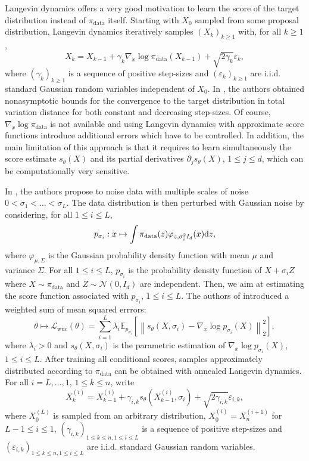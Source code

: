\documentclass[english,graybox,envcountchap,envcountsame,sectrefs,shortlabels]{svmono}
\theoremstyle{style}
\newcommand{\eqsp}{}
\begin{document}
Langevin dynamics offers a very good motivation to learn the score of the target distribution instead of $\pi_{\mathrm{data}}$ itself. Starting with $X_0$ sampled from some proposal distribution, Langevin dynamics iteratively samples $(X_k)_{k\geq 1}$ with, for all $k\geq 1$,
$$
X_{k} = X_{k-1} +  \gamma_k \nabla_x\log\pi_{\mathrm{data}}(X_{k-1}) + \sqrt{2\gamma_k}\varepsilon_k\eqsp,
$$
where $(\gamma_k)_{k\geq 1}$ is a sequence of positive step-sizes and $(\varepsilon_k)_{k\geq 1}$ are i.i.d. standard Gaussian random variables independent of $X_0$.  In \cite{durmus2017nonasymptotic}, the authors obtained nonasymptotic bounds for the convergence to the target distribution in total variation distance for both constant and decreasing step-sizes. Of course, $\nabla_x\log\pi_{\mathrm{data}}$ is not available and using Langevin dynamics with approximate score functions introduce additional errors which have to be controlled. In addition, the main limitation of this approach is that it requires to learn simultaneously the score estimate $s_\theta(X)$ and its partial derivatives $\partial_j s_\theta(X)$, $1\leq j \leq d$, which can be computationally very sensitive.

In \cite{song2019generative}, the authors propose to noise data with  multiple scales of noise $0<\sigma_1 < \ldots <\sigma_L$. The data distribution is then perturbed with Gaussian noise by considering, for all $1\leq i \leq L$,
$$
p_{\sigma_i}:x \mapsto \int \pi_{\mathrm{data}}(z)\varphi_{z,\sigma^2_i I_d}(x)\rmd z\eqsp,
$$   
where $\varphi_{\mu,\Sigma}$ is the Gaussian probability density function with mean $\mu$ and variance $\Sigma$. For all $1\leq i \leq L$, $p_{\sigma_i}$ is the probability density function of $X + \sigma_i Z$ where $X\sim \pi_{\mathrm{data}}$ and $Z\sim \mathcal{N}(0,I_d)$ are independent. Then, we aim at estimating the score function associated with $p_{\sigma_i}$, $1\leq i \leq L$.  The authors of \cite{song2019generative} introduced a weighted sum of mean squared errrors: 
$$
\theta\mapsto \mathcal{L}_{\mathrm{wuc}}(\theta) = \sum_{i=1}^L\lambda_i\mathbb{E}_{p_{\sigma_i}}\left[\left\|s_\theta(X,\sigma_i) - \nabla_x\log p_{\sigma_i}(X)\right\|_2^2\right]\eqsp,
$$ 
where $\lambda_i>0$ and $s_\theta(X,\sigma_i)$ is the parametric estimation of $\nabla_x\log p_{\sigma_i}(X)$, $1\leq i \leq L$. After training all conditional scores, samples approximately distributed according to $\pi_{\mathrm{data}}$ can be obtained with annealed Langevin dynamics. For all $i = L, \ldots, 1$, $1\leq k \leq n$, write 
$$
X^{(i)}_{k} = X^{(i)}_{k-1} +  \gamma_{i,k} s_\theta(X^{(i)}_{k-1},\sigma_i) + \sqrt{2\gamma_{i,k}}\varepsilon_{i,k}\eqsp,
$$
where $X_0^{(L)}$ is sampled from an arbitrary distribution, $X^{(i)}_{0}=X^{(i+1)}_{n}$ for $L-1\leq i \leq 1$, $(\gamma_{i,k})_{1 \leq k\leq n, 1\leq i \leq L}$ is a sequence of positive step-sizes and $(\varepsilon_{i,k})_{1 \leq k\leq n, 1\leq i \leq L}$ are i.i.d. standard Gaussian random variables.
\end{document}
